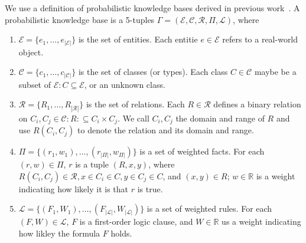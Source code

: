 We use a definition of probabilistic knowledge bases derived in previous work~\cite{chen2014knowledge}.
A probabilistic knowledge base is a 5-tuples \(\Gamma = (\mathcal{E}, \mathcal{C}, \mathcal{R}, \Pi, \mathcal{L})\), where
\begin{enumerate}[leftmargin=0cm,itemindent=.5cm,labelwidth=\itemindent,labelsep=0cm,align=left]
\vspace{-1em}
\item \(\mathcal{E} = \{ e_1, \ldots, e_{|\mathcal{E}|} \} \) is the set of entities.
Each entitie \( e \in \mathcal{E} \) refers to a real-world object.

\vspace{-1em}
\item \(\mathcal{C} = \{ c_1, \ldots, c_{|\mathcal{C}|} \} \) is the set of classes (or types).
Each class \( C \in \mathcal{C} \) maybe be a subset of \(\mathcal{E} : C \subseteq \mathcal{E}\), or an unknown class.

\vspace{-1em}
\item \(\mathcal{R} = \{ R_1, \ldots, R_{|\mathcal{R}|} \} \) is the set of relations.
Each \(R \in \mathcal{R} \) defines a binary relation on \(C_i, C_j \in \mathcal{C}: R: \subseteq C_i \times C_j\).
We call \(C_i, C_j\) the domain and range of \(R\) and use \(R(C_i,C_j)\) to denote the relation and its domain and range.


\vspace{-1em}
\item \(\Pi = \{(r_1, w_1), \ldots, (r_{|\Pi|}, w_{\Pi|})\} \) is a set of weighted facts.
For each \( (r,w) \in \Pi\), \(r\) is a tuple  \((R,x,y)\),
where \(R(C_i,C_j) \in \mathcal{R}, x \in C_i \in C, y \in C_j \in C\), and \((x,y) \in R\);
\(w \in \mathbb{R}\) is a weight indicating how likely it is that \(r\) is true. 

\vspace{-1em}
\item \(\mathcal{L} = \{(F_1,W_1),\ldots, (F_{|\mathcal{L}|}, W_{|\mathcal{L}|}) \} \) is a set of weighted rules.
For each \((F, W) \in \mathcal{L} \), \(F\) is a first-order logic clause, and \(W \in \mathbb{R} \) us a weight indicating how likley the formula \(F\) holds. 

\end{enumerate}





